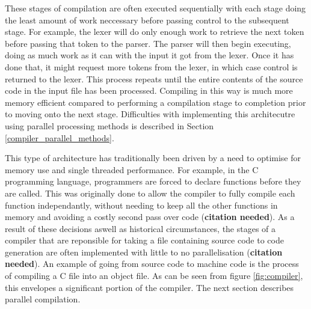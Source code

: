 These stages of compilation are often executed sequentially with each stage
doing the least amount of work neccessary before passing control to the
subsequent stage. For example, the lexer will do only enough work to retrieve
the next token before passing that token to the parser. The parser will then
begin executing, doing as much work as it can with the input it got from the
lexer. Once it has done that, it might request more tokens from the lexer,
in which case control is returned to the lexer. This process repeats until
the entire contents of the source code in the input file has been processed.
Compiling in this way is much more memory efficient compared to performing
a compilation stage to completion prior to moving onto the next stage.
Difficulties with implementing this architecutre using parallel processing
methods is described in Section \ref{compiler_parallel_methods}.

This type of architecture has traditionally been driven by a need to optimise
for memory use and single threaded performance. For example, in the C
programming language, programmers are forced to declare functions before they
are called. This was originally done to allow the compiler to fully compile
each function independantly, without needing to keep all the other functions
in memory and avoiding a costly second pass over code (\textbf{citation
needed}). As a result of these decisions aswell as historical circumstances,
the stages of a compiler that are reponsible  for taking a file containing
source code to code generation are often implemented with little to no
parallelisation (\textbf{citation needed}). An example of going from source code
to machine code is the process of compiling a C file into an object file. As can
be seen from figure \ref{fig:compiler}, this envelopes a significant portion of
the compiler. The next section describes parallel compilation.


